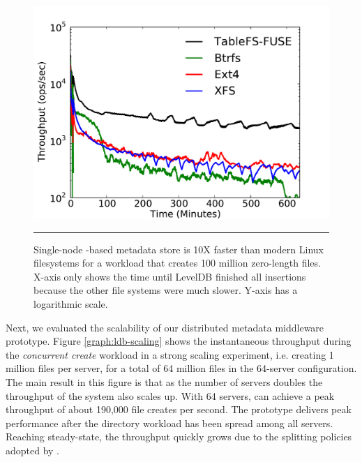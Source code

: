 \begin{figure}[t]  %
\centerline{\includegraphics[scale=0.5]{./figs/ldb_insertrate_onenode}}
\caption{\normalsize
Single-node \ldb{}-based metadata store is 10X faster than modern Linux
filesystems for a workload that creates 100 million zero-length files.
X-axis only shows the time until LevelDB finished all insertions because the other 
file systems were much slower. Y-axis has a logarithmic scale.
}
\vspace{10pt}
\hrule 
\label{graph:ldb-singlenode}
\end{figure}       %


Next, we evaluated the scalability of our distributed metadata middleware
prototype.
Figure \ref{graph:ldb-scaling} shows the instantaneous throughput during the 
\textit{concurrent create} workload in a strong scaling experiment, i.e.
creating 1 million files per server, for a total of 64 million files in the
64-server configuration.
The main result in this figure is that as the number of servers doubles the
throughput of the system also scales up. With 64 servers, \giga{} can achieve a
peak throughput of about 190,000 file creates per second. The prototype delivers
peak performance after the directory workload has been spread among all
servers.
Reaching steady-state, the throughput quickly grows due to the splitting
policies adopted by \giga{}.

